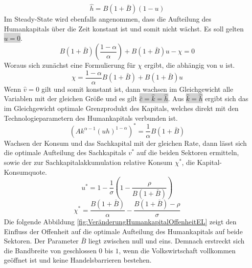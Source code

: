 \begin{equation}
\boxed{\hat{h}=B(1+\bar{B})(1-u)}
\end{equation}
Im Steady-State wird ebenfalls angenommen, dass die Aufteilung des Humankapitals über die Zeit konstant ist und somit nicht wächst. Es soll gelten \colorbox{lightgray}{$\hat{u}=0$}.  
\begin{equation}
B (1+\bar{B}) \left(\frac{1- \alpha}{\alpha}\right) + B (1+\bar{B}) u - \chi =0
\end{equation}
Woraus sich zunächst eine Formulierung für $\chi$ ergibt, die abhängig von $u$ ist. 
\begin{equation}
\chi = \frac{1- \alpha}{\alpha} B (1+\bar{B}) + B (1+\bar{B}) u
\end{equation}
Wenn $\hat{v}=0$ gilt und somit konstant ist, dann wachsen im Gleichgewicht alle Variablen mit der gleichen Grö{\ss}e und es gilt \colorbox{lightgray}{$\hat{c}=\hat{k}=\hat{h}$}. Aus \colorbox{lightgray}{$\hat{k}=\hat{h}$} ergibt sich das im Gleichgewicht optimale Grenzprodukt des Kapitals, welches direkt mit den Technologieparametern des Humankapitals verbunden ist.
\begin{equation}
\boxed{(Ak^{\alpha -1} (uh)^{1- \alpha})^* = \frac{1}{\alpha} B (1+\bar{B})}
\end{equation}
Wachsen der Konsum und das Sachkapital mit der gleichen Rate, dann lässt sich die optimale Aufteilung des Sachkapitals $v^*$ auf die beiden Sektoren ermitteln, sowie der zur Sachkapitalakkumulation relative Konsum $\chi^*$, die Kapital-Konsumquote.
\begin{equation}
\boxed{u^*= 1- \frac{1}{\sigma}\left(1-  \frac{\rho}{B (1+\bar{B})}\right)}
\end{equation}
\begin{equation}
\boxed{\chi^* = \frac{B (1+\bar{B})}{\alpha}- \frac{B (1+\bar{B})- \rho}{\sigma}}
\end{equation}
Die folgende Abbildung \ref{fig:VeränderungHumankapitalOffenheitEL} zeigt den Einfluss der Offenheit auf die optimale Aufteilung des Humankapitals auf beide Sektoren. Der Parameter $\bar{B}$ liegt zwischen null und eins. Demnach erstreckt sich die Bandbreite von geschlossen $0$ bis $1$, wenn die Volkswirtschaft vollkommen geöffnet ist und keine Handelsbarrieren bestehen. \newline%
